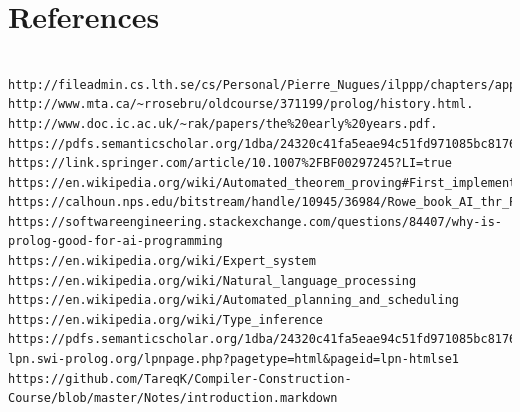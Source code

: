 \documentclass[14pt]{article}
\begin{document}
\section{References} 
\begin{verbatim}
	
http://fileadmin.cs.lth.se/cs/Personal/Pierre_Nugues/ilppp/chapters/appA.pdf.
http://www.mta.ca/~rrosebru/oldcourse/371199/prolog/history.html. 
http://www.doc.ic.ac.uk/~rak/papers/the%20early%20years.pdf.
https://pdfs.semanticscholar.org/1dba/24320c41fa5eae94c51fd971085bc8176dd7.pdf
https://link.springer.com/article/10.1007%2FBF00297245?LI=true
https://en.wikipedia.org/wiki/Automated_theorem_proving#First_implementations
https://calhoun.nps.edu/bitstream/handle/10945/36984/Rowe_book_AI_thr_Prolog_preface.pdf https://softwareengineering.stackexchange.com/questions/84407/why-is-prolog-good-for-ai-programming
https://en.wikipedia.org/wiki/Expert_system
https://en.wikipedia.org/wiki/Natural_language_processing 
https://en.wikipedia.org/wiki/Automated_planning_and_scheduling 
https://en.wikipedia.org/wiki/Type_inference https://pdfs.semanticscholar.org/1dba/24320c41fa5eae94c51fd971085bc8176dd7.pdfhttps://en.wikipedia.org/wiki/Prolog
lpn.swi-prolog.org/lpnpage.php?pagetype=html&pageid=lpn-htmlse1
https://github.com/TareqK/Compiler-Construction-Course/blob/master/Notes/introduction.markdown
\end{verbatim}
\end{document}
